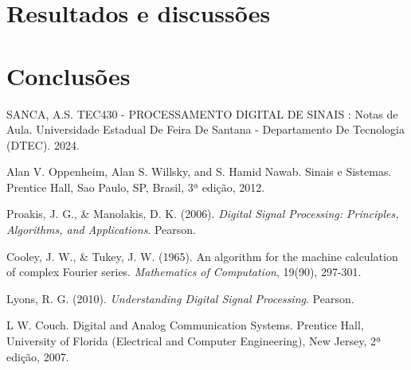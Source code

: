 \documentclass[conference]{IEEEtran}
\begin{document}
\section{Resultados e discussões}


\section{Conclusões}



\begin{thebibliography}{00}
     SANCA, A.S. TEC430 - PROCESSAMENTO DIGITAL DE SINAIS : Notas de Aula. Universidade Estadual De Feira De Santana - Departamento De Tecnologia (DTEC). 2024.

     Alan V. Oppenheim, Alan S. Willsky, and S. Hamid Nawab. Sinais e Sistemas. Prentice Hall, Sao Paulo, SP, Brasil, 3ª edição, 2012.

    Proakis, J. G., \& Manolakis, D. K. (2006). \textit{Digital Signal Processing: Principles, Algorithms, and Applications}. Pearson.

    Cooley, J. W., \& Tukey, J. W. (1965). An algorithm for the machine calculation of complex Fourier series. \textit{Mathematics of Computation}, 19(90), 297-301.

    Lyons, R. G. (2010). \textit{Understanding Digital Signal Processing}. Pearson.

     L W. Couch. Digital and Analog Communication Systems. Prentice Hall, University of Florida (Electrical and Computer Engineering), New Jersey, 2ª edição, 2007.
\end{thebibliography}
\end{document}
